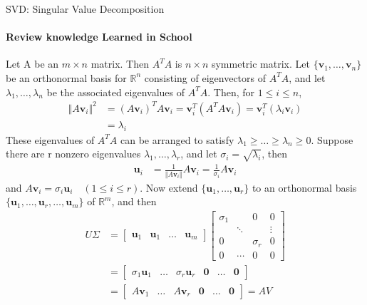 \documentclass{beamer}
\begin{document}
\begin{frame}{SVD: Singular Value Decomposition}
  \framesubtitle{Review knowledge Learned in School}
  {\tiny
    Let A be an $m{\times}n$ matrix. Then $A^{T}A$ is $n{\times}n$ symmetric matrix.
    Let $\{\textbf{v}_1,\dots,\textbf{v}_n\}$ be an orthonormal basis for $\mathbb{R}^n$ consisting of eigenvectors of $A^{T}A$, and let $\lambda_1,\dots,\lambda_n$ be the associated eigenvalues of $A^{T}A$.
    Then, for $1 \leq i \leq n$,
    \begin{align*}
      \Vert A \textbf{v}_i \Vert^2 &= (A \textbf{v}_i)^T A \textbf{v}_i = \textbf{v}_i^T (A^T A \textbf{v}_i) = \textbf{v}_i^T (\lambda_i \textbf{v}_i) \\
                                   &= \lambda_i
    \end{align*}
    These eigenvalues of $A^TA$ can be arranged to satisfy $\lambda_1 \geq \dots \geq \lambda_n \geq 0$.
    Suppose there are r nonzero eigenvalues ${\lambda_1,\dots,\lambda_r}$, and let $\sigma_i = \sqrt{\lambda_i}$, then
    \begin{align*}
      \textbf{u}_i &= \frac{1}{\Vert A \textbf{v}_i \Vert} A \textbf{v}_i = \frac{1}{\sigma_i} A \textbf{v}_i
    \end{align*}
    and $A \textbf{v}_i = \sigma_i \textbf{u}_i \quad ( 1 \leq i \leq r)$.
    Now extend $\{\textbf{u}_1,\dots,\textbf{u}_r\}$ to an orthonormal basis $\{\textbf{u}_1,\dots,\textbf{u}_r,\dots,\textbf{u}_m\}$ of $\mathbb{R}^m$, and then
    \begin{align*}
      U\Sigma &=
      \begin{bmatrix} \textbf{u}_1 & \textbf{u}_1 & \dots & \textbf{u}_m \end{bmatrix}
      \begin{bmatrix}
        \sigma_1   &        & 0          & 0      \\
                   & \ddots &            & \vdots \\
        0          &        & \sigma_r   & 0      \\
        0          & \cdots & 0          & 0
      \end{bmatrix} \\
      &= \begin{bmatrix} \sigma_1 \textbf{u}_1 & \dots & \sigma_r \textbf{u}_r & \textbf{0} & \dots & \textbf{0} \end{bmatrix} \\
      &= \begin{bmatrix} A \textbf{v}_1        & \dots & A \textbf{v}_r        & \textbf{0} & \dots & \textbf{0} \end{bmatrix} = AV \\

\end{align*}}
\end{frame}
\end{document}
